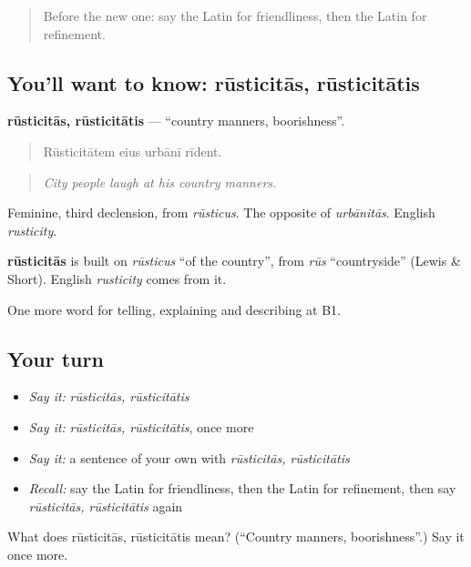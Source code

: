\begin{quote}
Before the new one: say the Latin for friendliness, then the Latin for refinement.
\end{quote}

\subsection*{You'll want to know: rūsticitās, rūsticitātis}
\textbf{rūsticitās, rūsticitātis} — \textquotedblleft{}country manners, boorishness\textquotedblright{}.

\begin{quote}
Rūsticitātem eius urbānī rīdent.
\end{quote}

\begin{quote}
\emph{City people laugh at his country manners.}
\end{quote}

Feminine, third declension, from \emph{rūsticus}. The opposite of \emph{urbānitās}. English \emph{rusticity}.

\begin{cousinweb}
\textbf{rūsticitās} is built on \emph{rūsticus} \textquotedblleft{}of the country\textquotedblright{}, from \emph{rūs} \textquotedblleft{}countryside\textquotedblright{} (Lewis \& Short). English \emph{rusticity} comes from it.
\end{cousinweb}

\begin{grammarlens}[title={What you've built}]
One more word for telling, explaining and describing at B1.
\end{grammarlens}

\subsection*{Your turn}
\begin{itemize}
\raggedright
  \item \emph{Say it:} \emph{rūsticitās, rūsticitātis}
  \item \emph{Say it:} \emph{rūsticitās, rūsticitātis}, once more
  \item \emph{Say it:} a sentence of your own with \emph{rūsticitās, rūsticitātis}
  \item \emph{Recall:} say the Latin for friendliness, then the Latin for refinement, then say \emph{rūsticitās, rūsticitātis} again
\end{itemize}

\begin{tcolorbox}[breakable,colback=teal!4,colframe=teal!35!black,title={Before you move on}]
What does rūsticitās, rūsticitātis mean? (\textquotedblleft{}Country manners, boorishness\textquotedblright{}.) Say it once more.
\end{tcolorbox}

